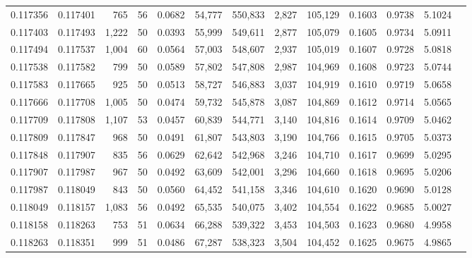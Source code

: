 \begin{tabular}{rrrrrrrrrrrrr}
0.117356 & 0.117401 &   765 &  56 &                                     0.0682 &  54,777 & 550,833 &   2,827 & 105,129 & 0.1603 & 0.9738 & 5.1024 \\
0.117403 & 0.117493 & 1,222 &  50 &                                     0.0393 &  55,999 & 549,611 &   2,877 & 105,079 & 0.1605 & 0.9734 & 5.0911 \\
0.117494 & 0.117537 & 1,004 &  60 &                                     0.0564 &  57,003 & 548,607 &   2,937 & 105,019 & 0.1607 & 0.9728 & 5.0818 \\
0.117538 & 0.117582 &   799 &  50 &                                     0.0589 &  57,802 & 547,808 &   2,987 & 104,969 & 0.1608 & 0.9723 & 5.0744 \\
0.117583 & 0.117665 &   925 &  50 &                                     0.0513 &  58,727 & 546,883 &   3,037 & 104,919 & 0.1610 & 0.9719 & 5.0658 \\
0.117666 & 0.117708 & 1,005 &  50 &                                     0.0474 &  59,732 & 545,878 &   3,087 & 104,869 & 0.1612 & 0.9714 & 5.0565 \\
0.117709 & 0.117808 & 1,107 &  53 &                                     0.0457 &  60,839 & 544,771 &   3,140 & 104,816 & 0.1614 & 0.9709 & 5.0462 \\
0.117809 & 0.117847 &   968 &  50 &                                     0.0491 &  61,807 & 543,803 &   3,190 & 104,766 & 0.1615 & 0.9705 & 5.0373 \\
0.117848 & 0.117907 &   835 &  56 &                                     0.0629 &  62,642 & 542,968 &   3,246 & 104,710 & 0.1617 & 0.9699 & 5.0295 \\
0.117907 & 0.117987 &   967 &  50 &                                     0.0492 &  63,609 & 542,001 &   3,296 & 104,660 & 0.1618 & 0.9695 & 5.0206 \\
0.117987 & 0.118049 &   843 &  50 &                                     0.0560 &  64,452 & 541,158 &   3,346 & 104,610 & 0.1620 & 0.9690 & 5.0128 \\
0.118049 & 0.118157 & 1,083 &  56 &                                     0.0492 &  65,535 & 540,075 &   3,402 & 104,554 & 0.1622 & 0.9685 & 5.0027 \\
0.118158 & 0.118263 &   753 &  51 &                                     0.0634 &  66,288 & 539,322 &   3,453 & 104,503 & 0.1623 & 0.9680 & 4.9958 \\
0.118263 & 0.118351 &   999 &  51 &                                     0.0486 &  67,287 & 538,323 &   3,504 & 104,452 & 0.1625 & 0.9675 & 4.9865 \\

\end{tabular}
